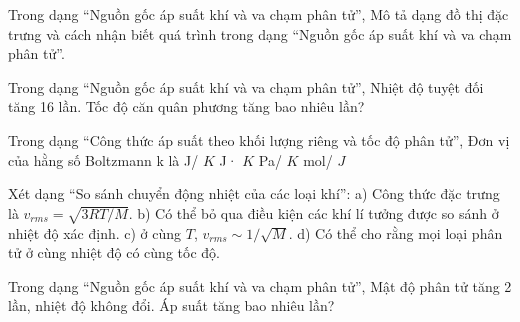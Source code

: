 \begin{ex}
Trong dạng “Nguồn gốc áp suất khí và va chạm phân tử”, Mô tả dạng đồ thị đặc trưng và cách nhận biết quá trình trong dạng “Nguồn gốc áp suất khí và va chạm phân tử”.
\choiceTF

\end{ex}

\begin{ex}
Trong dạng “Nguồn gốc áp suất khí và va chạm phân tử”, Nhiệt độ tuyệt đối tăng 16 lần. Tốc độ căn quân phương tăng bao nhiêu lần?
\end{ex}

\begin{ex}
Trong dạng “Công thức áp suất theo khối lượng riêng và tốc độ phân tử”, Đơn vị của hằng số Boltzmann k là
\choice
{\True J/ $K$}
{J· $K$}
{Pa/ $K$}
{mol/ $J$}
\end{ex}

\begin{ex}
Xét dạng “So sánh chuyển động nhiệt của các loại khí”: a) Công thức đặc trưng là $v_{rms}=\sqrt{3RT/M}$. b) Có thể bỏ qua điều kiện các khí lí tưởng được so sánh ở nhiệt độ xác định. c) ở cùng $T$, $v_{rms}\sim1/\sqrt M$. d) Có thể cho rằng mọi loại phân tử ở cùng nhiệt độ có cùng tốc độ.
\choiceTF

\end{ex}

\begin{ex}
Trong dạng “Nguồn gốc áp suất khí và va chạm phân tử”, Mật độ phân tử tăng 2 lần, nhiệt độ không đổi. Áp suất tăng bao nhiêu lần?
\end{ex}

